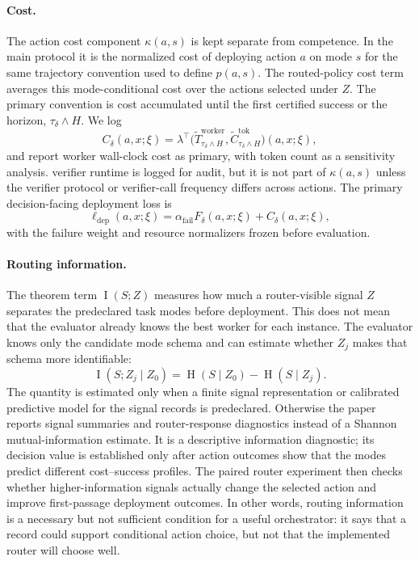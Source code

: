 \documentclass{article}
\DeclareMathOperator{\MI}{I}
\DeclareMathOperator{\Hent}{H}
\begin{document}
\paragraph{Cost.}
The action cost component $\kappa(a,s)$ is kept separate from competence.
In the main protocol it is the normalized cost of deploying action $a$ on mode $s$ for the same trajectory convention used to define $p(a,s)$.
The routed-policy cost term averages this mode-conditional cost over the actions selected under $Z$.
The primary convention is cost accumulated until the first certified success or the horizon, $\tau_\delta\wedge H$.
We log
\[
C_\delta(a,x;\xi)
=
\lambda^\top
\bigl(
\widetilde T^{\mathrm{worker}}_{\tau_\delta\wedge H},
\widetilde C^{\mathrm{tok}}_{\tau_\delta\wedge H}
\bigr)(a,x;\xi),
\]
and report worker wall-clock cost as primary, with token count as a sensitivity analysis.
verifier runtime is logged for audit, but it is not part of $\kappa(a,s)$ unless the verifier protocol or verifier-call frequency differs across actions.
The primary decision-facing deployment loss is
\begin{equation}
\ell_{\mathrm{dep}}(a,x;\xi)
=
\alpha_{\mathrm{fail}}F_\delta(a,x;\xi)
+
C_\delta(a,x;\xi),
\label{eq:deployment-loss}
\end{equation}
with the failure weight and resource normalizers frozen before evaluation.

\paragraph{Routing information.}
The theorem term $\MI(S;Z)$ measures how much a router-visible signal $Z$ separates the predeclared task modes before deployment.
This does not mean that the evaluator already knows the best worker for each instance.
The evaluator knows only the candidate mode schema and can estimate whether $Z_j$ makes that schema more identifiable:
\[
\MI(S;Z_j\mid Z_0)=\Hent(S\mid Z_0)-\Hent(S\mid Z_j).
\]
The quantity is estimated only when a finite signal representation or calibrated predictive model for the signal records is predeclared.
Otherwise the paper reports signal summaries and router-response diagnostics instead of a Shannon mutual-information estimate.
It is a descriptive information diagnostic; its decision value is established only after action outcomes show that the modes predict different cost--success profiles.
The paired router experiment then checks whether higher-information signals actually change the selected action and improve first-passage deployment outcomes.
In other words, routing information is a necessary but not sufficient condition for a useful orchestrator: it says that a record could support conditional action choice, but not that the implemented router will choose well.
\end{document}
